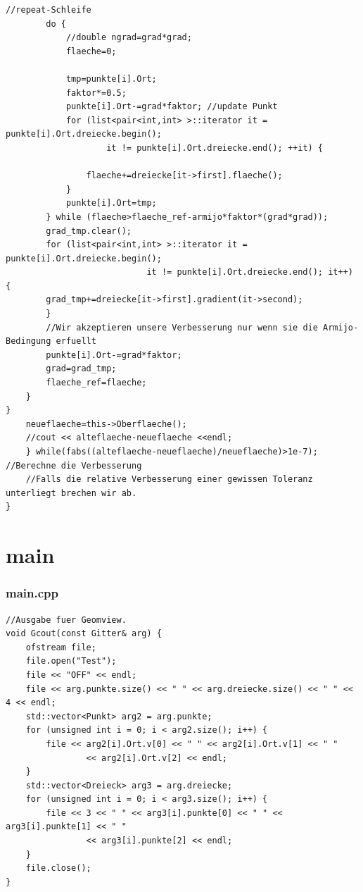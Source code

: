 \documentclass{beamer}
\begin{document}
\begin{frame}[fragile]
\begin{lstlisting}
//repeat-Schleife
		do {
			//double ngrad=grad*grad;
			flaeche=0;

			tmp=punkte[i].Ort;
			faktor*=0.5;
			punkte[i].Ort-=grad*faktor; //update Punkt
			for (list<pair<int,int> >::iterator it = punkte[i].Ort.dreiecke.begin();
					it != punkte[i].Ort.dreiecke.end(); ++it) {

				flaeche+=dreiecke[it->first].flaeche();
			}
			punkte[i].Ort=tmp;
		} while (flaeche>flaeche_ref-armijo*faktor*(grad*grad));
		grad_tmp.clear();
		for (list<pair<int,int> >::iterator it = punkte[i].Ort.dreiecke.begin();
							it != punkte[i].Ort.dreiecke.end(); it++) {
		grad_tmp+=dreiecke[it->first].gradient(it->second);
		}
		//Wir akzeptieren unsere Verbesserung nur wenn sie die Armijo-Bedingung erfuellt
		punkte[i].Ort-=grad*faktor;
		grad=grad_tmp;
		flaeche_ref=flaeche;
	}
}
	neueflaeche=this->Oberflaeche();
	//cout << alteflaeche-neueflaeche <<endl;
	} while(fabs((alteflaeche-neueflaeche)/neueflaeche)>1e-7); //Berechne die Verbesserung
	//Falls die relative Verbesserung einer gewissen Toleranz unterliegt brechen wir ab.
}
\end{lstlisting}
\end{frame}

\section{main}

\begin{frame}[fragile]

\frametitle{main.cpp}

\begin{lstlisting}
//Ausgabe fuer Geomview.
void Gcout(const Gitter& arg) {
	ofstream file;
	file.open("Test");
	file << "OFF" << endl;
	file << arg.punkte.size() << " " << arg.dreiecke.size() << " " << 4 << endl;
	std::vector<Punkt> arg2 = arg.punkte;
	for (unsigned int i = 0; i < arg2.size(); i++) {
		file << arg2[i].Ort.v[0] << " " << arg2[i].Ort.v[1] << " "
				<< arg2[i].Ort.v[2] << endl;
	}
	std::vector<Dreieck> arg3 = arg.dreiecke;
	for (unsigned int i = 0; i < arg3.size(); i++) {
		file << 3 << " " << arg3[i].punkte[0] << " " << arg3[i].punkte[1] << " "
				<< arg3[i].punkte[2] << endl;
	}
	file.close();
}
\end{lstlisting}
\end{frame}
\end{document}
